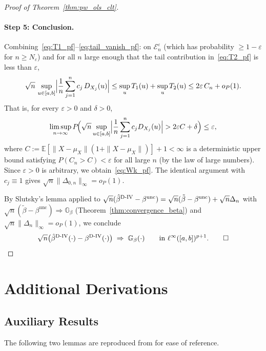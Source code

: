 \documentclass[12pt]{article}
\newcommand{\E}{\mathbb{E}}
\newcommand{\est}{\ensuremath{\textnormal{D-IV}}\xspace}
\begin{document}
\begin{proof}[Proof of Theorem~\ref{thm:pw_ols_clt}]
\paragraph{Step 5: Conclusion.}
Combining~\eqref{eq:T1_pf}--\eqref{eq:tail_vanish_pf}: on $\mathcal{E}_n^\varepsilon$ (which has probability $\ge 1-\varepsilon$ for $n\ge N_\varepsilon$) and for all $n$ large enough that the tail contribution in~\eqref{eq:T2_pf} is less than $\varepsilon$,
\[
\sqrt{n}\,\sup_{u\in[a,b]}\Bigl|\frac{1}{n}\sum_{j=1}^n c_j\,D_{X_j}(u)\Bigr|
\le \sup_u T_1(u)+\sup_u T_2(u)
\le 2\varepsilon\, C_n + o_P(1).
\]
That is, for every $\varepsilon>0$ and $\delta>0$,
\[
\limsup_{n\to\infty}P\!\Bigl(\sqrt{n}\sup_{u\in[a,b]}\Bigl|\frac{1}{n}\sum_{j=1}^n c_j D_{X_j}(u)\Bigr|>2\varepsilon C+\delta\Bigr)\le\varepsilon,
\]
where $C:=\E[\|X-\mu_X\|(1+\|X-\mu_X\|)]+1<\infty$ is a deterministic upper bound satisfying $P(C_n>C)<\varepsilon$ for all large $n$ (by the law of large numbers). Since $\varepsilon>0$ is arbitrary, we obtain~\eqref{eq:Wk_pf}. The identical argument with $c_j\equiv 1$ gives $\sqrt{n}\|\Delta_{0,n}\|_\infty=o_P(1)$.
 
By Slutsky's lemma applied to $\sqrt{n}(\hat\beta^{\est}-\beta^{\mathrm{unc}})=\sqrt{n}(\tilde\beta-\beta^{\mathrm{unc}})+\sqrt{n}\Delta_n$ with $\sqrt{n}(\tilde\beta-\beta^{\mathrm{unc}})\Rightarrow\mathbb{G}_\beta$ (Theorem~\ref{thm:convergence_beta}) and $\sqrt{n}\|\Delta_n\|_\infty=o_P(1)$, we conclude
\[
\sqrt{n}\bigl(\hat\beta^{\est}(\cdot)-\beta^{\est}(\cdot)\bigr)\;\Rightarrow\;\mathbb{G}_\beta(\cdot)\qquad\text{in }\ell^\infty([a,b])^{p+1}.\qed
\]
\end{proof}


\newpage
\section{Additional Derivations}

\subsection{Auxiliary Results}

The following two lemmas are reproduced from \citet{van2025regression} for ease of reference.
\end{document}
